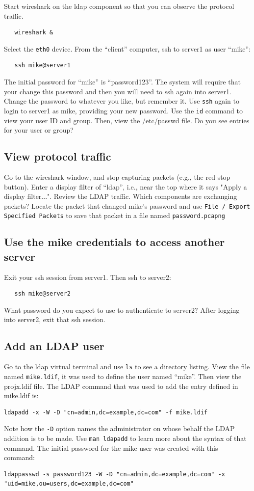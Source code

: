 Start wireshark on the ldap component so that you can observe the protocol traffic.
\begin{verbatim}
   wireshark &
\end{verbatim}
\noindent Select the {\tt eth0} device.
From the ``client'' computer, ssh to server1 as user ``mike'':
\begin{verbatim}
   ssh mike@server1
\end{verbatim}
The initial password for ``mike'' is ``password123''.  The system will require that
your change this password and then you will need to ssh again into server1.  Change
the password to whatever you like, but remember it. Use {\tt ssh} again to login to server1
as mike, providing your new password. Use the {\tt id} command to view your user ID
and group. Then,  view the /etc/passwd file.  Do you see entries
for your user or group?

\subsection{View protocol traffic}
Go to the wireshark window, and stop capturing packets (e.g., the red stop button).
Enter a display filter of ``ldap'', i.e., near the top where it says "Apply a display filter...".
Review the LDAP traffic.  Which components are exchanging packets?  Locate the packet that changed
mike's password and use {\tt File / Export Specified Packets} to save that packet in a file named
{\tt password.pcapng}

\subsection{Use the mike credentials to access another server}
Exit your ssh session from server1.  Then ssh to server2:
\begin{verbatim}
   ssh mike@server2
\end{verbatim}
\noindent What password do you expect to use to authenticate to server2?
After logging into server2, exit that ssh session.

\subsection{Add an LDAP user}
Go to the ldap virtual terminal and use {\tt ls} to see a directory listing.
View the file named {\tt mike.ldif}, it was used to define the user named ``mike''.
Then view the projx.ldif file.
The LDAP command that was used to add the entry defined in mike.ldif is:
\begin{verbatim}
ldapadd -x -W -D "cn=admin,dc=example,dc=com" -f mike.ldif
\end{verbatim}
\noindent Note how the {\tt -D} option names the administrator on whose behalf the
LDAP addition is to be made.  Use {\tt man ldapadd} to learn more about the syntax of
that command. 
The initial password for the mike user was created with this command:
\begin{verbatim}
ldappasswd -s password123 -W -D "cn=admin,dc=example,dc=com" -x "uid=mike,ou=users,dc=example,dc=com"
\end{verbatim}

